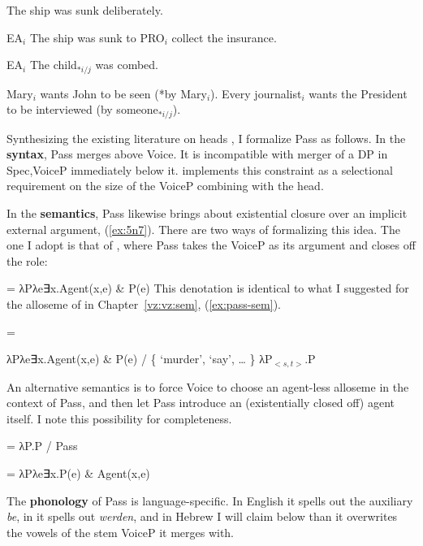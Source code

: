 \begin{exe}
\begin{xlist}
\begin{exe}
\ex  \label{ex:pass-adv-en}The ship was sunk deliberately. 

\ex  \label{ex:pass-pro-en}EA$_i$ The ship was sunk to PRO$_i$ collect the insurance. 

\ex  \label{ex:pass-dre-en}EA$_i$ The child$_{*i/j}$ was combed. 

 \ex  \label{ex:pass-bind-en} 
 \begin{xlist} 
 	\ex  Mary$_i$ wants John to be seen (*by Mary$_i$). 
 	\ex  Every journalist$_i$ wants the President to be interviewed (by someone$_{*i/j}$). 
 \z
\z 

Synthesizing the existing literature on  heads \citep{bruening13,layering15}, I formalize Pass as follows. In the \textbf{syntax}, Pass merges above Voice. It is incompatible with merger of a DP in Spec,VoiceP immediately below it. \cite{bruening13} implements this constraint as a selectional requirement on the size of the VoiceP combining with the  head.

In the \textbf{semantics}, Pass likewise brings about existential closure over an implicit external argument, (\ref{ex:5n7}). There are two ways of formalizing this idea. The one I adopt is that of \cite{bruening13}, where Pass takes the VoiceP as its argument and closes off the  role:
 \begin{exe}
\ex  \label{ex:5n7} = λPλe∃x.Agent(x,e) \& P(e) 
 \z 
This denotation is identical to what I suggested for the  alloseme of {\vz} in Chapter~\ref{vz:vz:sem}, (\ref{ex:pass-sem}).
 \begin{exe}
	\ex  \label{ex:pass-sem}\denote{\vz} = 
	\begin{xlist}
		\ex λPλe∃x.Agent(x,e) \& P(e) / \{ `murder',  ‘say’, {\dots} \} 
		\ex λP$_{<s,t>}$.P
		\z
	\z 

An alternative semantics is to force Voice to choose an agent-less alloseme in the context of Pass, and then let Pass introduce an (existentially closed off) agent itself. I note this possibility for completeness.
 \begin{exe}
\ex  {} = λP.P / Pass \trace 

\ex  {} = λPλe∃x.P(e) \& Agent(x,e) 
 \z 

The \textbf{phonology} of Pass is language-specific. In English it spells out the auxiliary \emph{be}, in  it spells out \emph{werden}, and in Hebrew I will claim below than it overwrites the vowels of the stem VoiceP it merges with.



\end{exe}
\end{xlist}
\end{exe}
\end{exe}
\end{xlist}
\end{exe}
\end{xlist}
\end{exe}
